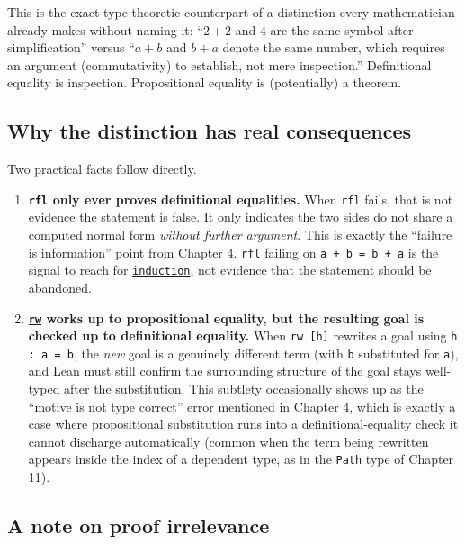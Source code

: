 This is the exact type-theoretic counterpart of a distinction every mathematician already makes without naming it: ``\(2+2\) and \(4\) are the same symbol after simplification'' versus ``\(a+b\) and \(b+a\) denote the same number, which requires an argument (commutativity) to establish, not mere inspection.'' Definitional equality is inspection. Propositional equality is (potentially) a theorem.

\subsection{Why the distinction has real consequences}\label{sec:05-rigor-check:04-defeq-vs-propeq:4}

Two practical facts follow directly.

\begin{enumerate}
\def\labelenumi{\arabic{enumi}.}
\tightlist
\item
  \textbf{\texttt{rfl} only ever proves definitional equalities.} When \texttt{rfl} fails, that is not evidence the statement is false. It only indicates the two sides do not share a computed normal form \emph{without further argument}. This is exactly the ``failure is information'' point from Chapter 4. \texttt{rfl} failing on \texttt{a + b = b + a} is the signal to reach for \href{https://lean-lang.org/doc/reference/latest/Tactic-Proofs/Tactic-Reference/}{\texttt{induction}}, not evidence that the statement should be abandoned.
\item
  \textbf{\href{https://lean-lang.org/doc/reference/latest/Tactic-Proofs/Tactic-Reference/}{\texttt{rw}} works up to propositional equality, but the resulting goal is checked up to definitional equality.} When \texttt{rw [h]} rewrites a goal using \texttt{h : a = b}, the \emph{new} goal is a genuinely different term (with \texttt{b} substituted for \texttt{a}), and Lean must still confirm the surrounding structure of the goal stays well-typed after the substitution. This subtlety occasionally shows up as the ``motive is not type correct'' error mentioned in Chapter 4, which is exactly a case where propositional substitution runs into a definitional-equality check it cannot discharge automatically (common when the term being rewritten appears inside the index of a dependent type, as in the \texttt{Path} type of Chapter 11).
\end{enumerate}

\subsection{A note on proof irrelevance}\label{sec:05-rigor-check:04-defeq-vs-propeq:5}

